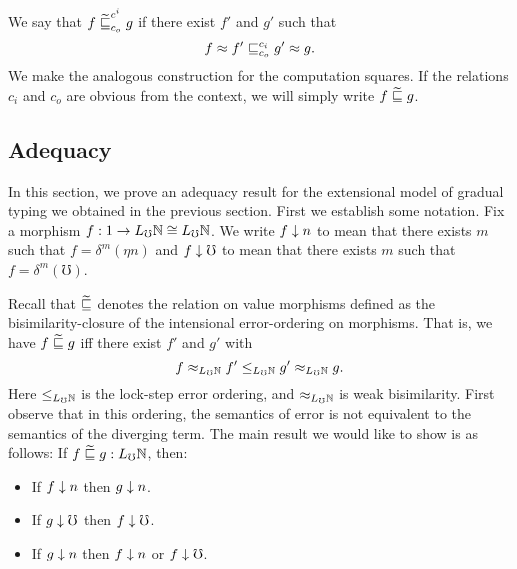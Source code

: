 %
We say that $f \mathrel{{\widetilde{\sqsubseteq}}^{c^i}_{c_o}} g$ if there
exist $f'$ and $g'$ such that
%
\[ f \approx f' \mathrel{\sqsubseteq^{c_i}_{c_o}} g' \approx g. \]
%
We make the analogous construction for the computation squares. If the relations
$c_i$ and $c_o$ are obvious from the context, we will simply write $f \mathrel{\widetilde{\sqsubseteq}}
g$.


\subsection{Adequacy}\label{sec:adequacy}

In this section, we prove an adequacy result for the extensional model of
gradual typing we obtained in the previous section. First we establish some
notation. Fix a morphism $f : 1 \to L_\mho \mathbb{N} \cong L_\mho \mathbb{N}$. We
write $f \downarrow n$ to mean that there exists $m$ such that $f = \delta^m(\eta n)$
and $f \downarrow \mho$ to mean that there exists $m$ such that $f = \delta^m(\mho)$.

Recall that $\mathrel{\widetilde{\sqsubseteq}}$ denotes the relation on value morphisms defined as the
bisimilarity-closure of the intensional error-ordering on morphisms. That is, we
have $f \mathrel{\widetilde{\sqsubseteq}} g$ iff there exist $f'$ and $g'$ with
%
\[ f \approx_{L_\mho \mathbb{N}} f' \le_{L_\mho \mathbb{N}} g' \approx_{L_\mho \mathbb{N}} g. \]
%
Here $\le_{L_\mho \mathbb{N}}$ is the lock-step error ordering, and $\approx_{L_\mho
\mathbb{N}}$ is weak bisimilarity. First observe that in this ordering, the
semantics of error is not equivalent to the semantics of the diverging term. The
main result we would like to show is as follows: If $f \mathrel{\widetilde{\sqsubseteq}} g : L_\mho \mathbb{N}$, then:
\begin{itemize}
  \item If $f \downarrow n$ then $g \downarrow n$.
  \item If $g \downarrow \mho$ then $f \downarrow \mho$.
  \item If $g \downarrow n$ then $f \downarrow n$ or $f \downarrow \mho$.
\end{itemize}

